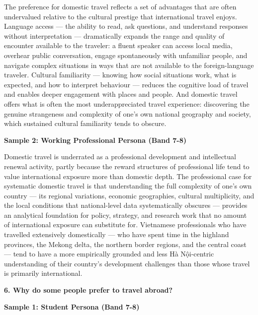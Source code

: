 The preference for domestic travel reflects a set of advantages that are often undervalued relative to the cultural prestige that international travel enjoys. Language access — the ability to read, ask questions, and understand responses without interpretation — dramatically expands the range and quality of encounter available to the traveler: a fluent speaker can access local media, overhear public conversation, engage spontaneously with unfamiliar people, and navigate complex situations in ways that are not available to the foreign-language traveler. Cultural familiarity — knowing how social situations work, what is expected, and how to interpret behaviour — reduces the cognitive load of travel and enables deeper engagement with places and people. And domestic travel offers what is often the most underappreciated travel experience: discovering the genuine strangeness and complexity of one's own national geography and society, which sustained cultural familiarity tends to obscure.

\textbf{Sample 2: Working Professional Persona (Band 7-8)}

Domestic travel is underrated as a professional development and intellectual renewal activity, partly because the reward structures of professional life tend to value international exposure more than domestic depth. The professional case for systematic domestic travel is that understanding the full complexity of one's own country — its regional variations, economic geographies, cultural multiplicity, and the local conditions that national-level data systematically obscures — provides an analytical foundation for policy, strategy, and research work that no amount of international exposure can substitute for. Vietnamese professionals who have travelled extensively domestically — who have spent time in the highland provinces, the Mekong delta, the northern border regions, and the central coast — tend to have a more empirically grounded and less Hà Nội-centric understanding of their country's development challenges than those whose travel is primarily international.

\separator

\begin{ieltsquestion}
\textbf{6. Why do some people prefer to travel abroad?}
\end{ieltsquestion}
\textbf{Sample 1: Student Persona (Band 7-8)}

